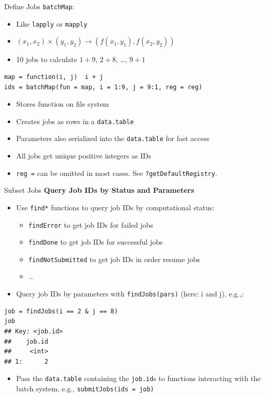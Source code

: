 \documentclass[10pt,compress,t,notes=noshow, xcolor=table]{beamer}
\begin{document}
\begin{frame}[fragile]{Define Jobs}
  \texttt{batchMap}:
  \begin{itemize}
    \item Like \texttt{lapply} or \texttt{mapply}
    \item \((x_1, x_2) \times (y_1, y_2) \rightarrow ( f(x_1, y_1), f(x_2, y_2) )\)
    \item 10 jobs to calculate \(1+9\), \(2+8\), \ldots, \(9+1\)
  \end{itemize}
  
\begin{lstlisting}
map = function(i, j)  i + j
ids = batchMap(fun = map, i = 1:9, j = 9:1, reg = reg)
\end{lstlisting}
  
  \begin{itemize}
    \item Stores function on file system
    \item Creates jobs as rows in a \texttt{data.table}
    \item Parameters also serialized into the \texttt{data.table} for fast access
    \item All jobs get unique positive integers as IDs
    \item \texttt{reg =} can be omitted in most cases. See \texttt{?getDefaultRegistry}.
  \end{itemize}
\end{frame}



\begin{frame}[fragile]{Subset Jobs}
\textbf{Query Job IDs by Status and Parameters}
\begin{itemize}
\item Use \texttt{find*} functions to query job IDs by computational status:
\begin{itemize}
\item \texttt{findError} to get job IDs for failed jobs
\item \texttt{findDone} to get job IDs for successful jobs
\item \texttt{findNotSubmitted} to get job IDs in order resume jobs
\item ...
\end{itemize}
\item Query job IDs by parameters with \texttt{findJobs(pars)} (here: i and j), e.g.,:
\end{itemize}
\begin{lstlisting}
job = findJobs(i == 2 & j == 8)
job
## Key: <job.id>
##    job.id
##     <int>
## 1:      2
\end{lstlisting}
\begin{itemize}
\item Pass the \texttt{data.table} containing the \texttt{job.id}s to functions interacting with the batch system, e.g., \texttt{submitJobs(ids = job)}
\end{itemize}
\end{frame}
\end{document}
